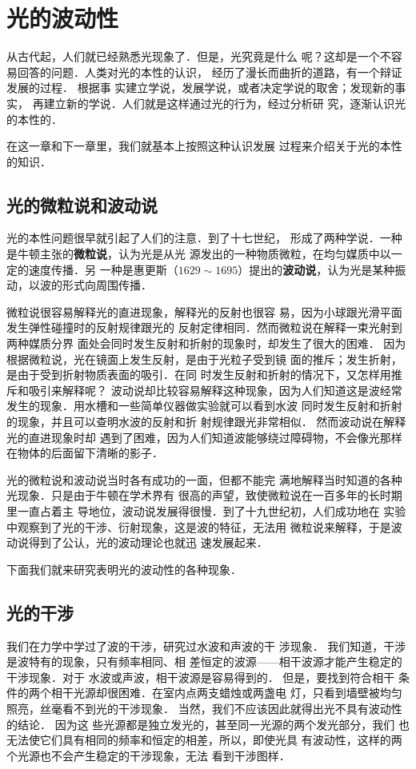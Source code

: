\chapter{光的波动性}\label{chapter-wave-nature-of-light}

从古代起，人们就已经熟悉光现象了．但是，光究竟是什么
呢？这却是一个不容易回答的问题．人类对光的本性的认识，
经历了漫长而曲折的道路，有一个辩证发展的过程．
根据事
实建立学说，发展学说，或者决定学说的取舍；发现新的事实，
再建立新的学说．人们就是这样通过光的行为，经过分析研
究，逐渐认识光的本性的．

在这一章和下一章里，我们就基本上按照这种认识发展
过程来介绍关于光的本性的知识．

\section{光的微粒说和波动说}
光的本性问题很早就引起了人们的注意．到了十七世纪，
形成了两种学说．一种是牛顿主张的\textbf{微粒说}，认为光是从光
源发出的一种物质微粒，在均匀媒质中以一定的速度传播．另
一种是惠更斯（$1629 \sim 1695$）提出的\textbf{波动说}，认为光是某种振
动，以波的形式向周围传播．

微粒说很容易解释光的直进现象，解释光的反射也很容
易，因为小球跟光滑平面发生弹性碰撞时的反射规律跟光的
反射定律相同．然而微粒说在解释一束光射到两种媒质分界
面处会同时发生反射和折射的现象时，却发生了很大的困难．
因为根据微粒说，光在镜面上发生反射，是由于光粒子受到镜
面的推斥；发生折射，是由于受到折射物质表面的吸引．在同
时发生反射和折射的情况下，又怎样用推斥和吸引来解释呢？
波动说却比较容易解释这种现象，因为人们知道这是波经常
发生的现象．用水槽和一些简单仪器做实验就可以看到水波
同时发生反射和折射的现象，并且可以查明水波的反射和折
射规律跟光非常相似．
然而波动说在解释光的直进现象时却
遇到了困难，因为人们知道波能够绕过障碍物，不会像光那样
在物体的后面留下清晰的影子．

光的微粒说和波动说当时各有成功的一面，但都不能完
满地解释当时知道的各种光现象．只是由于牛顿在学术界有
很高的声望，致使微粒说在一百多年的长时期里一直占着主
导地位，波动说发展得很慢．到了十九世纪初，人们成功地在
实验中观察到了光的干涉、衍射现象，这是波的特征，无法用
微粒说来解释，于是波动说得到了公认，光的波动理论也就迅
速发展起来．

下面我们就来研究表明光的波动性的各种现象．

\section{光的干涉}
我们在力学中学过了波的干涉，研究过水波和声波的干
涉现象．
我们知道，干涉是波特有的现象，只有频率相同、相
差恒定的波源——相干波源才能产生稳定的干涉现象．对于
水波或声波，相干波源是容易得到的．
但是，要找到符合相干
条件的两个相干光源却很困难．在室内点两支蜡烛或两盏电
灯，只看到墙壁被均匀照亮，丝毫看不到光的干涉现象．
当然，我们不应该因此就得出光不具有波动性的结论．
因为这
些光源都是独立发光的，甚至同一光源的两个发光部分，我们
也无法使它们具有相同的频率和恒定的相差，所以，即使光具
有波动性，这样的两个光源也不会产生稳定的干涉现象，无法
看到干涉图样．

